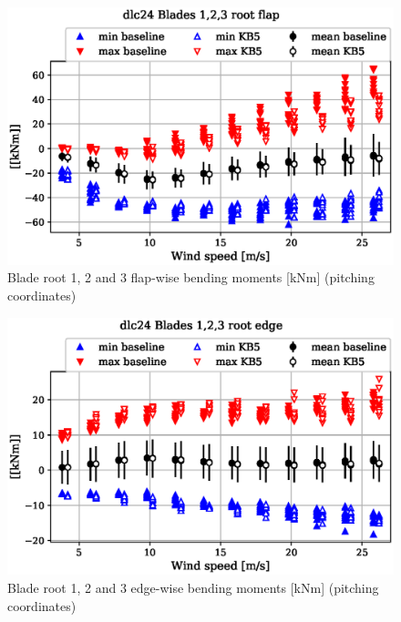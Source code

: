 \begin{figure}[!ht]
\begin{center}
	\includegraphics[width=.85\linewidth]{figures/baseline-vs-KB6/dlc24/blade1-blade1-node-001-momentvec-x_AA0007_AA0003.eps}
\end{center}
\caption{Blade root 1, 2 and 3 flap-wise bending moments [kNm] (pitching coordinates)}
\label{fig:baseline-vs-KB6:dlc24:blade-root-flap}
\end{figure}

\begin{figure}[!ht]
\begin{center}
	\includegraphics[width=.85\linewidth]{figures/baseline-vs-KB6/dlc24/blade1-blade1-node-001-momentvec-y_AA0007_AA0003.eps}
\end{center}
\caption{Blade root 1, 2 and 3 edge-wise bending moments [kNm] (pitching coordinates)}
\label{fig:baseline-vs-KB6:dlc24:blade-root-edge}
\end{figure}

